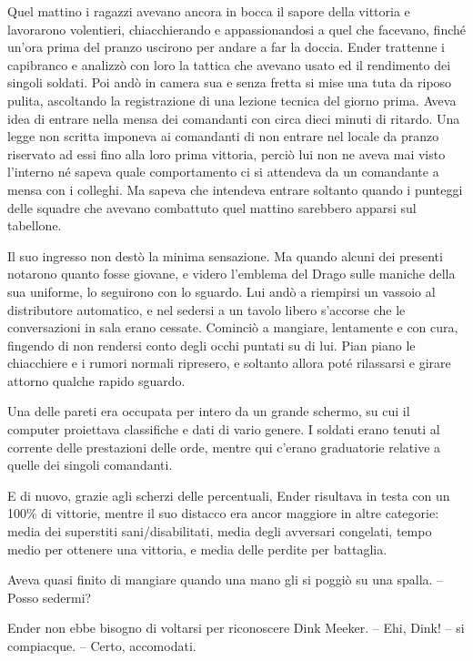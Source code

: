 {Quel mattino i ragazzi avevano ancora in bocca il sapore della vittoria
	e lavorarono volentieri, chiacchierando e appassionandosi a quel che
	facevano, finché un'ora prima del pranzo uscirono per andare a far la
	doccia. Ender trattenne i capibranco e analizzò con loro la tattica che
	avevano usato ed il rendimento dei singoli soldati. Poi andò in camera
	sua e senza fretta si mise una tuta da riposo pulita, ascoltando la
	registrazione di una lezione tecnica del giorno prima. Aveva idea di
	entrare nella mensa dei comandanti con circa dieci minuti di ritardo.
	Una legge non scritta imponeva ai comandanti di non entrare nel locale
	da pranzo riservato ad essi fino alla loro prima vittoria, perciò lui
	non ne aveva mai visto l'interno né sapeva quale comportamento ci si
	attendeva da un comandante a mensa con i colleghi. Ma sapeva che
	intendeva entrare soltanto quando i punteggi delle squadre che avevano
	combattuto quel mattino sarebbero apparsi sul tabellone.}

{Il suo ingresso non destò la minima sensazione. Ma quando alcuni dei
	presenti notarono quanto fosse giovane, e videro l'emblema del Drago
	sulle maniche della sua uniforme, lo seguirono con lo sguardo. Lui andò
	a riempirsi un vassoio al distributore automatico, e nel sedersi a un
	tavolo libero s'accorse che le conversazioni in sala erano cessate.
	Cominciò a mangiare, lentamente e con cura, fingendo di non rendersi
	conto degli occhi puntati su di lui. Pian piano le chiacchiere e i
	rumori normali ripresero, e soltanto allora poté rilassarsi e girare
	attorno qualche rapido sguardo.}

{Una delle pareti era occupata per intero da un grande schermo, su cui
	il computer proiettava classifiche e dati di vario genere. I soldati
	erano tenuti al corrente delle prestazioni delle orde, mentre qui
	c'erano graduatorie relative a quelle dei singoli comandanti.}

{E di nuovo, grazie agli scherzi delle percentuali, Ender risultava in
	testa con un 100\% di vittorie, mentre il suo distacco era ancor
	maggiore in altre categorie: media dei superstiti sani/disabilitati,
	media degli avversari congelati, tempo medio per ottenere una vittoria,
	e media delle perdite per battaglia.}

{Aveva quasi finito di mangiare quando una mano gli si poggiò su una
	spalla. -- Posso sedermi?}

{Ender non ebbe bisogno di voltarsi per riconoscere Dink Meeker. -- Ehi,
	Dink! -- si compiacque. -- Certo, accomodati.}

